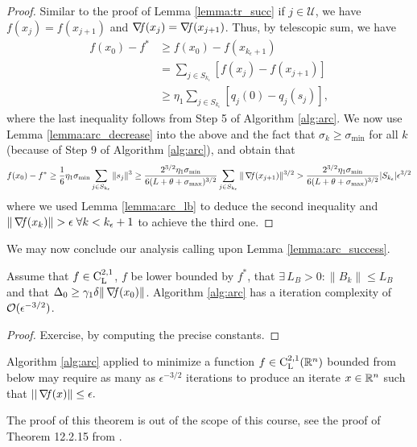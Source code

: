 \documentclass[10pt,a4paper]{article}
\begin{document}
\begin{proof}
	Similar to the proof of Lemma \ref{lemma:tr_succ} if $j\in \mathcal{U}$, we have $f(x_j) = f(x_{j+1})$ and $\operatorname*{\mathit{\nabla \!f}}(x_j)=\operatorname*{\mathit{\nabla \!f}}(x_{j+1})$. Thus, by telescopic sum, we have 
\begin{align*}
	f(x_0) - f^* &\geq f(x_0) - f(x_{k_\epsilon+1}) \\
	&= \sum_{j \in S_{k_\epsilon}} [f(x_j) - f(x_{j+1})] \\
	&\geq \eta_1 \sum_{j \in S_{k_\epsilon}} [q_j(0) - q_j(s_j)],
\end{align*}
where the last inequality follows from Step 5 of Algorithm \ref{alg:arc}. We now use Lemma \ref{lemma:arc_decrease} into the above and the fact that $\sigma_k \geq \sigma_{\min}$ for all $k$ (because of Step 9 of Algorithm \ref{alg:arc}), and obtain that
\begin{equation*}
	f(x_0) - f^* \geq \frac{1}{6}\eta_1 \sigma_{\min} \sum_{j \in S_{k_\epsilon}} \|s_j\|^3 \geq \frac{2^{3/2} \eta_1 \sigma_{\min}}{6(L + \theta + \sigma_{\max})^{3/2}} \sum_{j \in S_{k_\epsilon}} \|\operatorname*{\mathit{\nabla \!f}}(x_{j+1})\|^{3/2}> \frac{2^{3/2} \eta_1 \sigma_{\min}}{6(L + \theta + \sigma_{\max})^{3/2}} |S_{k_\epsilon}| \epsilon^{3/2}
\end{equation*}
where we used Lemma \ref{lemma:arc_lb} to deduce the second inequality and $\|\grad(x_k)\|>\epsilon \; \forall k<k_\epsilon+1$ to achieve the third one.
\end{proof}

\noindent We may now conclude our analysis calling upon Lemma \ref{lemma:arc_success}.
\begin{theorem}
	Assume that $f\in \mathord{\mathrm{C^{2,1}_{L}}}$, $f$ be lower bounded by $f^*$, that $\exists\, L_B>0: \|B_k\| \leq L_B$ and that $\Delta_0\geq \gamma_1 \delta \|\operatorname*{\mathit{\nabla \!f}}(x_0)\|$. Algorithm \ref{alg:arc} has a iteration complexity of $\mathcal{O}(\epsilon^{-3/2})$.
\end{theorem}
\begin{proof}
	Exercise, by computing the precise constants.
\end{proof}

\begin{theorem}
	Algorithm \ref{alg:arc} applied to minimize a function $f\in \mathord{\mathrm{C^{2,1}_{L}}}(\mathbb{R}^n)$ bounded from below may require as many as $\epsilon^{-3/2}$ iterations to produce an iterate $x\in \mathbb{R}^n$ such that $||\operatorname*{\mathit{\nabla \!f}} (x)\|\leq \epsilon.$
\end{theorem}
\noindent The proof of this theorem is out of the scope of this course, see the proof of Theorem 12.2.15 from \cite{cartis22a}.
\end{document}
